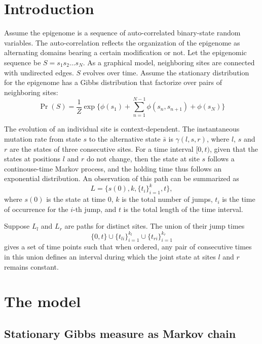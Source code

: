 \documentclass[11pt]{article}
\begin{document}
\section{Introduction}

Assume the epigenome is a sequence of auto-correlated binary-state
random variables. The auto-correlation reflects the organization of
the epigenome as alternating domains bearing a certain modification or
not. Let the epigenomic sequence be $S=s_1s_2\ldots s_N$. As a
graphical model, neighboring sites are connected with undirected
edges. $S$ evolves over time. Assume the stationary distribution for
the epigenome has a Gibbs distribution that factorize over pairs of
neighboring sites:
\begin{equation}\label{eqn:stationary}
\Pr(S) = \frac{1}{Z} \exp\big\{\phi(s_1) +\sum_{n=1}^{N-1}\phi(s_n, s_{n+1}) + \phi(s_N)\big\}
\end{equation}

The evolution of an individual site is context-dependent. The
instantaneous mutation rate from state $s$ to the alternative state
$\bar{s}$ is $\gamma(l, s, r)$, where $l$, $s$ and $r$ are the states
of three consecutive sites.  For a time interval $[0,t)$, given that
the states at positions $l$ and $r$ do not change, then the state
at site $s$ follows a continouse-time Markov process, and the holding
time thus follows an exponential distribution. An observation of
this path can be summarized as
\[
  L = \big\{s(0), k, \{t_i\}_{i=1}^{k}, t \big\},
\]
where $s(0)$ is the state at time 0, $k$ is the total number of jumps,
$t_i$ is the time of occurrence for the $i$-th jump, and $t$ is the total
length of the time interval.

Suppose $L_l$ and $L_r$ are paths for distinct sites. The union of their jump times
\[
  \{0, t\} \cup \{t_{li}\}_{i=1}^{k_l} \cup \{t_{ri}\}_{i=1}^{k_r}
\]
gives a set of time points such that when ordered, any pair
of consecutive times in this union defines an interval during
which the joint state at sites $l$ and $r$ remains
constant.

\section{The model}

\subsection{Stationary Gibbs measure as Markov chain}
\end{document}
